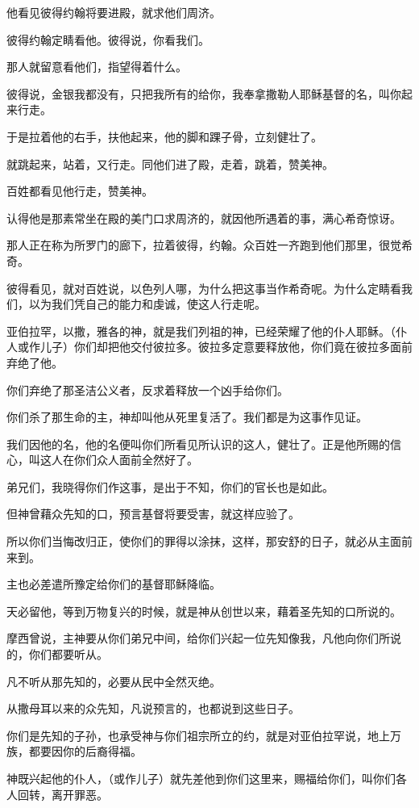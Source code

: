\documentclass[12pt,oneside]{book}
\begin{document}
他看见彼得约翰将要进殿，就求他们周济。

彼得约翰定睛看他。彼得说，你看我们。

那人就留意看他们，指望得着什么。

彼得说，金银我都没有，只把我所有的给你，我奉拿撒勒人耶稣基督的名，叫你起来行走。

于是拉着他的右手，扶他起来，他的脚和踝子骨，立刻健壮了。

就跳起来，站着，又行走。同他们进了殿，走着，跳着，赞美神。

百姓都看见他行走，赞美神。

认得他是那素常坐在殿的美门口求周济的，就因他所遇着的事，满心希奇惊讶。

那人正在称为所罗门的廊下，拉着彼得，约翰。众百姓一齐跑到他们那里，很觉希奇。

彼得看见，就对百姓说，以色列人哪，为什么把这事当作希奇呢。为什么定睛看我们，以为我们凭自己的能力和虔诚，使这人行走呢。

亚伯拉罕，以撒，雅各的神，就是我们列祖的神，已经荣耀了他的仆人耶稣。（仆人或作儿子）你们却把他交付彼拉多。彼拉多定意要释放他，你们竟在彼拉多面前弃绝了他。

你们弃绝了那圣洁公义者，反求着释放一个凶手给你们。

你们杀了那生命的主，神却叫他从死里复活了。我们都是为这事作见证。

我们因他的名，他的名便叫你们所看见所认识的这人，健壮了。正是他所赐的信心，叫这人在你们众人面前全然好了。

弟兄们，我晓得你们作这事，是出于不知，你们的官长也是如此。

但神曾藉众先知的口，预言基督将要受害，就这样应验了。

所以你们当悔改归正，使你们的罪得以涂抹，这样，那安舒的日子，就必从主面前来到。

主也必差遣所豫定给你们的基督耶稣降临。

天必留他，等到万物复兴的时候，就是神从创世以来，藉着圣先知的口所说的。

摩西曾说，主神要从你们弟兄中间，给你们兴起一位先知像我，凡他向你们所说的，你们都要听从。

凡不听从那先知的，必要从民中全然灭绝。

从撒母耳以来的众先知，凡说预言的，也都说到这些日子。

你们是先知的子孙，也承受神与你们祖宗所立的约，就是对亚伯拉罕说，地上万族，都要因你的后裔得福。

神既兴起他的仆人，（或作儿子）就先差他到你们这里来，赐福给你们，叫你们各人回转，离开罪恶。
\end{document}
